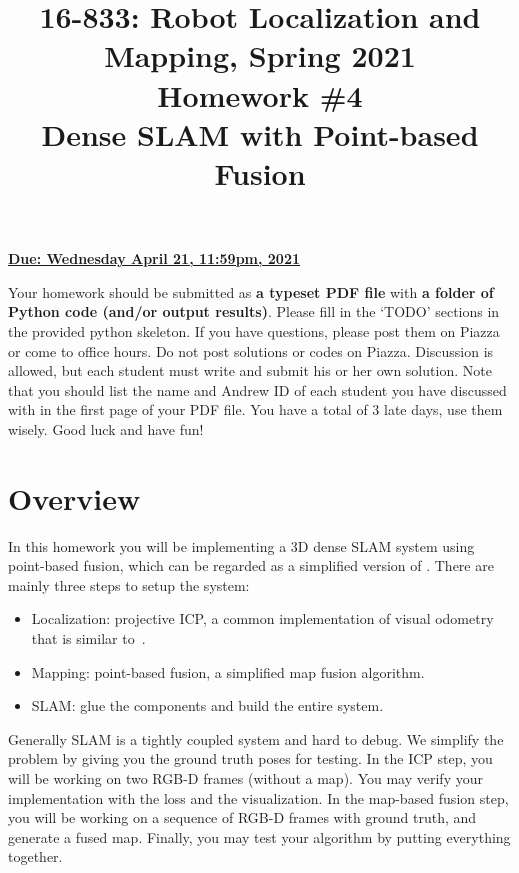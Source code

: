 \documentclass[12pt, a4paper]{article}
\date{}
\begin{document}
\title{\Large 16-833: Robot Localization and Mapping, Spring 2021\\
\textbf{\Large Homework \#4 \\ Dense SLAM with Point-based Fusion}}
\maketitle
\begin{flushright}
\textbf{\uline{Due: Wednesday April 21, 11:59pm, 2021}}
\par\end{flushright}

\def \ans{1} %

Your homework should be submitted as \textbf{a typeset PDF file} with
\textbf{a folder of Python code (and/or output results)}. Please fill in the `TODO' sections in the provided python skeleton.
If you have questions, please post them on Piazza
or come to office hours. Do not post solutions or codes on Piazza.
Discussion is allowed, but each student must write and submit his
or her own solution. Note that you should list the name and Andrew
ID of each student you have discussed with in the first page of your
PDF file. You have a total of 3 late days, use them wisely. Good luck
and have fun!


\section{Overview}

In this homework you will be implementing a 3D dense SLAM system using point-based fusion, which can be regarded as a simplified version of \cite{fusion}. There are mainly three steps to setup the system:
\begin{itemize}
    \item Localization: projective ICP, a common implementation of visual odometry that is similar to~\cite{icp}.
    \item Mapping: point-based fusion, a simplified map fusion algorithm.
    \item SLAM: glue the components and build the entire system.
\end{itemize}
Generally SLAM is a tightly coupled system and hard to debug. We simplify the problem by giving you the ground truth poses for testing. In the ICP step, you will be working on two RGB-D frames (without a map). You may verify your implementation with the loss and the visualization.
In the map-based fusion step, you will be working on a sequence of RGB-D frames with ground truth, and generate a fused map. Finally, you may test your algorithm by putting everything together.
\end{document}
